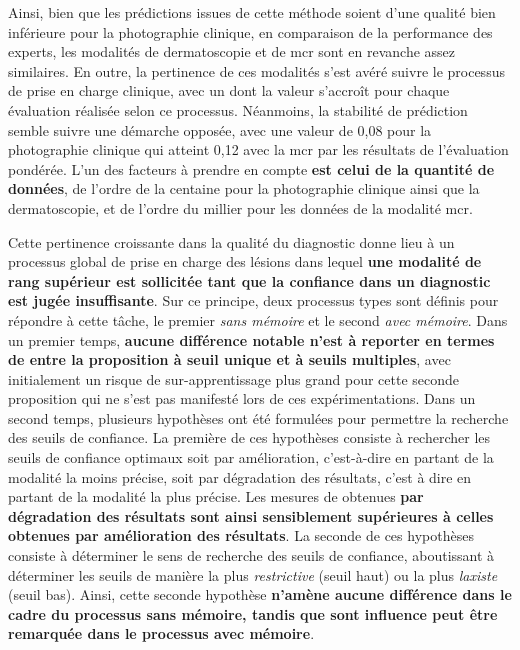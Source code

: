 Ainsi, bien que les prédictions issues de cette méthode soient d'une qualité bien inférieure pour la photographie clinique, en comparaison de la performance des experts, les modalités de dermatoscopie et de \gls{mcr} sont en revanche assez similaires. En outre, la pertinence de ces modalités s'est avéré suivre le processus de prise en charge clinique, avec un \fscore{} dont la valeur s'accroît pour chaque évaluation réalisée selon ce processus. Néanmoins, la stabilité de prédiction semble suivre une démarche opposée, avec une valeur de 0,08 pour la photographie clinique qui atteint 0,12 avec la \gls{mcr} par les résultats de l'évaluation pondérée. L'un des facteurs à prendre en compte \textbf{est celui de la quantité de données}, de l'ordre de la centaine pour la photographie clinique ainsi que la dermatoscopie, et de l'ordre du millier pour les données de la modalité \gls{mcr}.\par

Cette pertinence croissante dans la qualité du diagnostic donne lieu à un processus global de prise en charge des lésions dans lequel \textbf{une modalité de rang supérieur est sollicitée tant que la confiance dans un diagnostic est jugée insuffisante}. Sur ce principe, deux processus types sont définis pour répondre à cette tâche, le premier \textit{sans mémoire} et le second \textit{avec mémoire}. Dans un premier temps, \textbf{aucune différence notable n'est à reporter en termes de \fscore{} entre la proposition à seuil unique et à seuils multiples}, avec initialement un risque de sur-apprentissage plus grand pour cette seconde proposition qui ne s'est pas manifesté lors de ces expérimentations. Dans un second temps, plusieurs hypothèses ont été formulées pour permettre la recherche des seuils de confiance. La première de ces hypothèses consiste à rechercher les seuils de confiance optimaux soit par amélioration, c'est-à-dire en partant de la modalité la moins précise, soit par dégradation des résultats, c'est à dire en partant de la modalité la plus précise. Les mesures de \fscore{} obtenues \textbf{par dégradation des résultats sont ainsi sensiblement supérieures à celles obtenues par amélioration des résultats}. La seconde de ces hypothèses consiste à déterminer le sens de recherche des seuils de confiance, aboutissant à déterminer les seuils de manière la plus \textit{restrictive} (seuil haut) ou la plus \textit{laxiste} (seuil bas). Ainsi, cette seconde hypothèse \textbf{n'amène aucune différence dans le cadre du processus sans mémoire, tandis que sont influence peut être remarquée dans le processus avec mémoire}.\par
\clearpage


